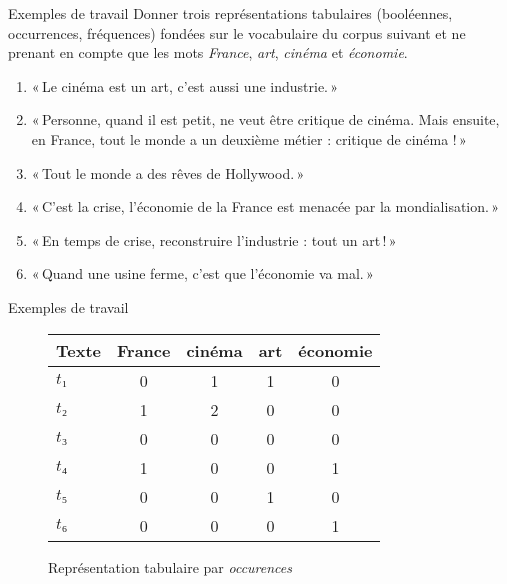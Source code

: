 \documentclass[../allslides.tex]{subfiles}
\begin{document}
\renewcommand\docdate{2021-02-18}  %



\begin{frame}{Exemples de travail}
	Donner trois représentations tabulaires (booléennes, occurrences, fréquences) fondées sur le vocabulaire du corpus suivant et ne prenant en compte que les mots \emph{France}, \emph{art}, \emph{cinéma} et \emph{économie}.
	\begin{enumerate}
		\item « Le cinéma est un art, c’est aussi une industrie. »
		\item « Personne, quand il est petit, ne veut être critique de cinéma. Mais ensuite, en France, tout le monde a un deuxième métier : critique de cinéma ! »
		\item « Tout le monde a des rêves de Hollywood. »
		\item « C’est la crise, l’économie de la France est menacée par la mondialisation. »
		\item « En temps de crise, reconstruire l’industrie : tout un art ! »
		\item « Quand une usine ferme, c’est que l’économie va mal. »
	\end{enumerate}
\end{frame}


\begin{frame}{Exemples de travail}
	\begin{figure}
		\caption{Représentation tabulaire par \emph{occurences}}
		\begin{tabular}{l*{4}{S}}
			\toprule
			\textbf{Texte} & {\textbf{France}} & {\textbf{cinéma}} & {\textbf{art}} & {\textbf{économie}}\\
			\midrule
			\(t₁\) & 0 & 1 & 1 & 0\\
			\(t₂\) & 1 & 2 & 0 & 0\\
			\(t₃\) & 0 & 0 & 0 & 0\\
			\(t₄\) & 1 & 0 & 0 & 1\\
			\(t₅\) & 0 & 0 & 1 & 0\\
			\(t₆\) & 0 & 0 & 0 & 1\\
			\hline
			\bottomrule
		\end{tabular}
	\end{figure}
\end{frame}
\end{document}
